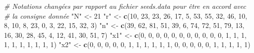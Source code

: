 \documentclass[
]{article}
\newenvironment{Shaded}{\begin{snugshade}}{\end{snugshade}}
\newcommand{\CommentTok}[1]{\textcolor[rgb]{0.56,0.35,0.01}{\textit{#1}}}
\newcommand{\DecValTok}[1]{\textcolor[rgb]{0.00,0.00,0.81}{#1}}
\newcommand{\FunctionTok}[1]{\textcolor[rgb]{0.13,0.29,0.53}{\textbf{#1}}}
\newcommand{\NormalTok}[1]{#1}
\newcommand{\OtherTok}[1]{\textcolor[rgb]{0.56,0.35,0.01}{#1}}
\newcommand{\StringTok}[1]{\textcolor[rgb]{0.31,0.60,0.02}{#1}}
\begin{document}
\begin{Shaded}
\begin{Highlighting}[]
\CommentTok{\# Notations changées par rapport au fichier seeds.data pour être en accord avec }
\CommentTok{\# la consigne donnée}
\StringTok{"N"} \OtherTok{\textless{}{-}} \DecValTok{21} 
\StringTok{"r"} \OtherTok{\textless{}{-}} \FunctionTok{c}\NormalTok{(}\DecValTok{10}\NormalTok{, }\DecValTok{23}\NormalTok{, }\DecValTok{23}\NormalTok{, }\DecValTok{26}\NormalTok{, }\DecValTok{17}\NormalTok{, }\DecValTok{5}\NormalTok{, }\DecValTok{53}\NormalTok{, }\DecValTok{55}\NormalTok{, }\DecValTok{32}\NormalTok{, }\DecValTok{46}\NormalTok{, }\DecValTok{10}\NormalTok{, }\DecValTok{8}\NormalTok{, }\DecValTok{10}\NormalTok{, }\DecValTok{8}\NormalTok{, }\DecValTok{23}\NormalTok{, }\DecValTok{0}\NormalTok{, }\DecValTok{3}\NormalTok{, }\DecValTok{22}\NormalTok{, }\DecValTok{15}\NormalTok{, }\DecValTok{32}\NormalTok{, }\DecValTok{3}\NormalTok{)}
\StringTok{"n"} \OtherTok{\textless{}{-}} \FunctionTok{c}\NormalTok{(}\DecValTok{39}\NormalTok{, }\DecValTok{62}\NormalTok{, }\DecValTok{81}\NormalTok{, }\DecValTok{51}\NormalTok{, }\DecValTok{39}\NormalTok{, }\DecValTok{6}\NormalTok{, }\DecValTok{74}\NormalTok{, }\DecValTok{72}\NormalTok{, }\DecValTok{51}\NormalTok{, }\DecValTok{79}\NormalTok{, }\DecValTok{13}\NormalTok{, }\DecValTok{16}\NormalTok{, }\DecValTok{30}\NormalTok{, }\DecValTok{28}\NormalTok{, }\DecValTok{45}\NormalTok{, }\DecValTok{4}\NormalTok{, }\DecValTok{12}\NormalTok{, }\DecValTok{41}\NormalTok{, }\DecValTok{30}\NormalTok{, }\DecValTok{51}\NormalTok{, }\DecValTok{7}\NormalTok{)}
\StringTok{"x1"} \OtherTok{\textless{}{-}} \FunctionTok{c}\NormalTok{(}\DecValTok{0}\NormalTok{, }\DecValTok{0}\NormalTok{, }\DecValTok{0}\NormalTok{, }\DecValTok{0}\NormalTok{, }\DecValTok{0}\NormalTok{, }\DecValTok{0}\NormalTok{, }\DecValTok{0}\NormalTok{, }\DecValTok{0}\NormalTok{, }\DecValTok{0}\NormalTok{, }\DecValTok{0}\NormalTok{, }\DecValTok{0}\NormalTok{, }\DecValTok{1}\NormalTok{, }\DecValTok{1}\NormalTok{, }\DecValTok{1}\NormalTok{, }\DecValTok{1}\NormalTok{, }\DecValTok{1}\NormalTok{, }\DecValTok{1}\NormalTok{, }\DecValTok{1}\NormalTok{, }\DecValTok{1}\NormalTok{, }\DecValTok{1}\NormalTok{, }\DecValTok{1}\NormalTok{)}
\StringTok{"x2"} \OtherTok{\textless{}{-}} \FunctionTok{c}\NormalTok{(}\DecValTok{0}\NormalTok{, }\DecValTok{0}\NormalTok{, }\DecValTok{0}\NormalTok{, }\DecValTok{0}\NormalTok{, }\DecValTok{0}\NormalTok{, }\DecValTok{1}\NormalTok{, }\DecValTok{1}\NormalTok{, }\DecValTok{1}\NormalTok{, }\DecValTok{1}\NormalTok{, }\DecValTok{1}\NormalTok{, }\DecValTok{1}\NormalTok{, }\DecValTok{0}\NormalTok{, }\DecValTok{0}\NormalTok{, }\DecValTok{0}\NormalTok{, }\DecValTok{0}\NormalTok{, }\DecValTok{0}\NormalTok{, }\DecValTok{1}\NormalTok{, }\DecValTok{1}\NormalTok{, }\DecValTok{1}\NormalTok{, }\DecValTok{1}\NormalTok{, }\DecValTok{1}\NormalTok{)}
\end{Highlighting}
\end{Shaded}
\end{document}
